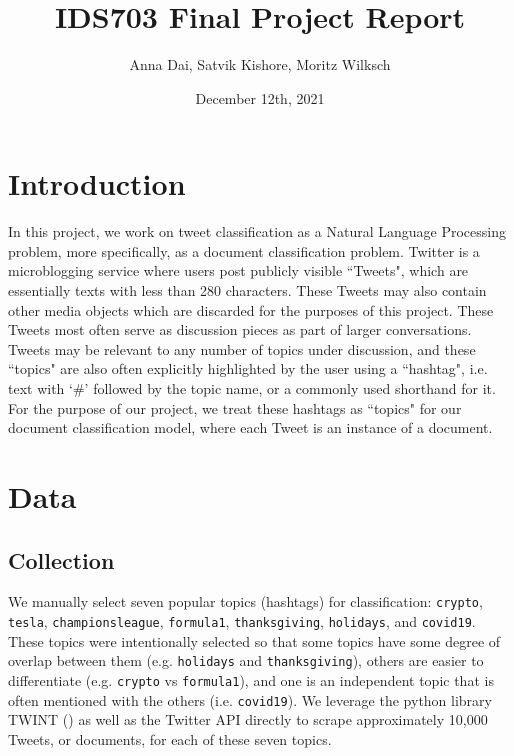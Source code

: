 \documentclass[11pt]{article}
\title{\vspace{-1.5cm}IDS703 Final Project Report}
\author{Anna Dai, Satvik Kishore, Moritz Wilksch}
\date{December 12th, 2021}
\begin{document}
\maketitle


\section{Introduction}

In this project, we work on tweet classification as a Natural Language Processing problem, more specifically, as a document classification problem. Twitter is a microblogging service where users post publicly visible ``Tweets", which are essentially texts with less than 280 characters. These Tweets may also contain other media objects which are discarded for the purposes of this project. These Tweets most often serve as discussion pieces as part of larger conversations. Tweets may be relevant to any number of topics under discussion, and these ``topics" are also often explicitly highlighted by the user using a ``hashtag", i.e. text with `\#' followed by the topic name, or a commonly used shorthand for it. For the purpose of our project, we treat these hashtags as ``topics" for our document classification model, where each Tweet is an instance of a document.


\section{Data}

\subsection{Collection}
We manually select seven popular topics (hashtags) for classification: \texttt{crypto}, \texttt{tesla}, \texttt{championsleague}, \texttt{formula1}, \texttt{thanksgiving}, \texttt{holidays}, and \texttt{covid19}. These topics were intentionally selected so that some topics have some degree of overlap between them (e.g. \texttt{holidays} and \texttt{thanksgiving}), others are easier to differentiate (e.g. \texttt{crypto} vs \texttt{formula1}), and one is an independent topic that is often mentioned with the others (i.e. \texttt{covid19}). We leverage the python library TWINT (\cite{twint}) as well as the Twitter API directly to scrape approximately 10,000 Tweets, or documents, for each of these seven topics.
\end{document}
